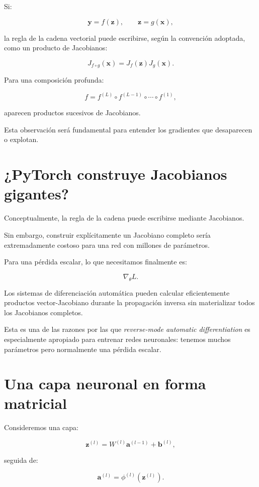 \documentclass[
  letterpaper,
  DIV=11,
  numbers=noendperiod]{scrartcl}
\begin{document}
Si:

\[
\mathbf y=f(\mathbf z),
\qquad
\mathbf z=g(\mathbf x),
\]

la regla de la cadena vectorial puede escribirse, según la convención
adoptada, como un producto de Jacobianos:

\[
J_{f\circ g}(\mathbf x)
=
J_f(\mathbf z)
J_g(\mathbf x).
\]

Para una composición profunda:

\[
f
=
f^{(L)}
\circ
f^{(L-1)}
\circ
\cdots
\circ
f^{(1)},
\]

aparecen productos sucesivos de Jacobianos.

Esta observación será fundamental para entender los gradientes que
desaparecen o explotan.

\section{¿PyTorch construye Jacobianos
gigantes?}\label{pytorch-construye-jacobianos-gigantes}

Conceptualmente, la regla de la cadena puede escribirse mediante
Jacobianos.

Sin embargo, construir explícitamente un Jacobiano completo sería
extremadamente costoso para una red con millones de parámetros.

Para una pérdida escalar, lo que necesitamos finalmente es:

\[
\nabla_\theta L.
\]

Los sistemas de diferenciación automática pueden calcular eficientemente
productos vector-Jacobiano durante la propagación inversa sin
materializar todos los Jacobianos completos.

Esta es una de las razones por las que \emph{reverse-mode automatic
differentiation} es especialmente apropiado para entrenar redes
neuronales: tenemos muchos parámetros pero normalmente una pérdida
escalar.

\section{Una capa neuronal en forma
matricial}\label{una-capa-neuronal-en-forma-matricial}

Consideremos una capa:

\[
\mathbf z^{(l)}
=
W^{(l)}\mathbf a^{(l-1)}
+
\mathbf b^{(l)},
\]

seguida de:

\[
\mathbf a^{(l)}
=
\phi^{(l)}(\mathbf z^{(l)}).
\]
\end{document}

